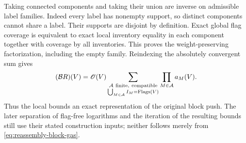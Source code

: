 Taking connected components and taking their union are inverse on
admissible label families. Indeed every label has nonempty support,
so distinct components cannot share a label. Their supports are
disjoint by definition. Exact global flag coverage is equivalent to
exact local inventory equality in each component together with
coverage by all inventories. This proves the weight-preserving
factorization, including the empty family. Reindexing the absolutely
convergent sum gives
\begin{equation}\label{eq:reassembly-block-gas}
 (\mathcal B R)(V)=\mathscr O(V)
   \sum_{\substack{\mathcal A\ {\rm finite,\ compatible}\\
                     \bigcup_{M\in\mathcal A}I_M=\operatorname{Flags}(V)}}
                         \prod_{M\in\mathcal A}a_M(V).
\end{equation}
Thus the local bounds an exact representation of the original
block push. The later separation of flag-free logarithms and the
iteration of the resulting bounds still use their stated construction
inputs; neither follows merely from \eqref{eq:reassembly-block-gas}.
